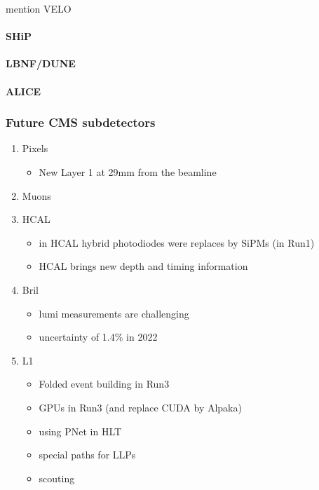 \documentclass[11pt]{article}
\begin{document}
mention VELO

\cite{lhcb_hllhc_tdr,lhcb_hllhc_interest}

\paragraph{SHiP}

\paragraph{LBNF/DUNE}

\paragraph{ALICE}
\subsubsection{Future CMS subdetectors}
\label{sec:orgfe6fb26}
\label{sec:hllhc_future_subdetectors.org}
\begin{enumerate}
\item Pixels
\label{sec:orgfeb6f77}
\begin{itemize}
\item New Layer 1 at 29mm from the beamline
\end{itemize}
\item Muons
\label{sec:org550ba2c}
\item HCAL
\label{sec:org7f966b0}
\begin{itemize}
\item in HCAL hybrid photodiodes were replaces by SiPMs (in Run1)
\item HCAL brings new depth and timing information
\end{itemize}
\item Bril
\label{sec:org184152f}
\begin{itemize}
\item lumi measurements are challenging
\item uncertainty of 1.4\% in 2022
\end{itemize}
\item L1
\label{sec:orgef400e8}
\begin{itemize}
\item Folded event building in Run3
\item GPUs in Run3 (and replace CUDA by Alpaka)
\item using PNet in HLT
\item special paths for LLPs
\item scouting
\end{itemize}
\end{enumerate}
\end{document}

